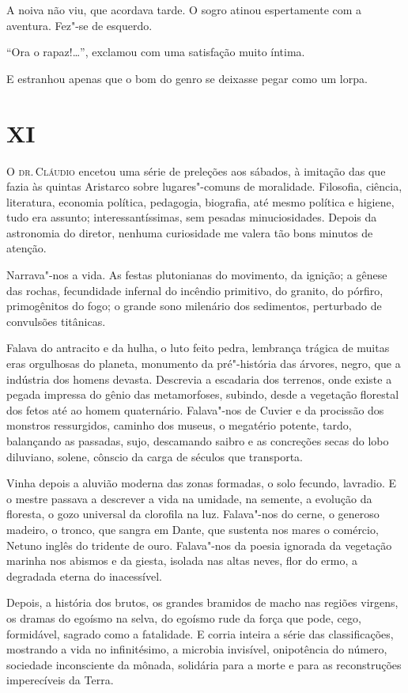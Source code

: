 A noiva não viu, que acordava tarde. O sogro atinou espertamente com a
aventura. Fez"-se de esquerdo. 

``Ora o rapaz!\ldots{}'', exclamou com uma satisfação muito íntima. 

E estranhou apenas que o bom do genro se
deixasse pegar como um lorpa.

\section{XI}

\noindent\textsc{O dr.\,Cláudio} encetou uma série de preleções aos sábados, à imitação das
que fazia às quintas Aristarco sobre lugares"-comuns de moralidade.
Filosofia, ciência, literatura, economia política, pedagogia,
biografia, até mesmo política e higiene, tudo era assunto;
interessantíssimas, sem pesadas minuciosidades. Depois da astronomia do
diretor, nenhuma curiosidade me valera tão bons minutos de atenção.

Narrava"-nos a vida. As festas plutonianas do movimento, da ignição; a
gênese das rochas, fecundidade infernal do incêndio primitivo, do
granito, do pórfiro, primogênitos do fogo; o grande sono milenário dos
sedimentos, perturbado de convulsões titânicas. 

Falava do antracito e
da hulha, o luto feito pedra, lembrança trágica de muitas eras
orgulhosas do planeta, monumento da pré"-história das árvores, negro,
que a indústria dos homens devasta. Descrevia a escadaria dos terrenos,
onde existe a pegada impressa do gênio das metamorfoses, subindo, desde
a vegetação florestal dos fetos até ao homem quaternário. Falava"-nos
de Cuvier e da procissão dos monstros ressurgidos, caminho dos museus,
o megatério potente, tardo, balançando as passadas, sujo, descamando
saibro e as concreções secas do lobo diluviano, solene, cônscio da
carga de séculos que transporta.

Vinha depois a aluvião moderna das zonas formadas, o solo fecundo,
lavradio. E o mestre passava a descrever a vida na umidade, na semente,
a evolução da floresta, o gozo universal da clorofila na luz.
Falava"-nos do cerne, o generoso madeiro, o tronco, que sangra em
Dante, que sustenta nos mares o comércio, Netuno inglês do tridente de
ouro. Falava"-nos da poesia ignorada da vegetação marinha nos abismos
e da giesta, isolada nas altas neves, flor do ermo, a degradada eterna
do inacessível. 

Depois, a história dos brutos, os grandes bramidos de
macho nas regiões virgens, os dramas do egoísmo na selva, do egoísmo
rude da força que pode, cego, formidável, sagrado como a fatalidade. E
corria inteira a série das classificações, mostrando a vida no
infinitésimo, a microbia invisível, onipotência do número, sociedade
inconsciente da mônada, solidária para a morte e para as reconstruções
imperecíveis da Terra. 

